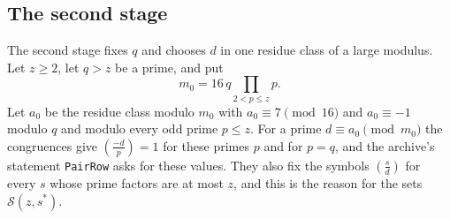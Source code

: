 \documentclass[11pt,letterpaper]{article}
\numberwithin{equation}{section}
\begin{document}
\subsection{The second stage}\label{sec:stage2}

The second stage fixes $q$ and chooses $d$ in one residue class of a large modulus. Let $z\ge2$, let $q>z$ be a prime, and put
\[
m_0=16\,q\prod_{2<p\le z}p .
\]
Let $a_0$ be the residue class modulo $m_0$ with $a_0\equiv7\pmod{16}$ and $a_0\equiv-1$ modulo $q$ and modulo every odd prime $p\le z$. For a prime $d\equiv a_0\pmod{m_0}$ the congruences give $(\tfrac{-d}p)=1$ for these primes $p$ and for $p=q$, and the archive's statement \texttt{PairRow} asks for these values. They also fix the symbols $(\tfrac sd)$ for every $s$ whose prime factors are at most $z$, and this is the reason for the sets $\mathcal S(z,s^\ast)$.
\end{document}
